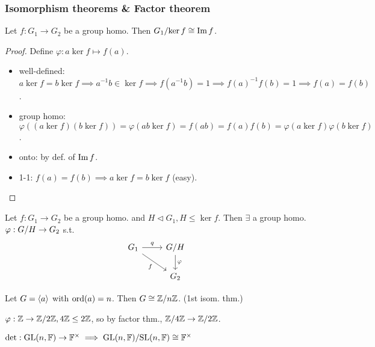 \subsubsection{Isomorphism theorems \& Factor theorem}
\begin{theorem}
  Let $f: G_1 \to G_2$ be a group homo. Then ${G_1}/{\ker f} \cong \operatorname{Im} f$.
  \begin{proof}
    Define $\varphi: a \ker f \mapsto f(a)$.
    \begin{itemize}
      \item well-defined: $a \ker f = b \ker f \implies a^{-1}b \in \ker f
        \implies f(a^{-1}b) = 1 \implies f(a)^{-1}f(b) = 1 \implies f(a)=f(b)$.
      \item group homo: $\varphi\left((a \ker f)(b\ker f)\right) = 
        \varphi(ab \ker f) = f(ab) = f(a)f(b) =
        \varphi(a\ker f)\varphi(b\ker f)$.
      \item onto: by def. of $\operatorname{Im} f$.
      \item 1-1: $f(a) = f(b) \implies a \ker f = b \ker f$ (easy).
      \end{itemize}
  \end{proof}
\end{theorem}

\begin{theorem}
  Let $f: G_1 \to G_2$ be a group homo. and $H \lhd G_1, H \le \ker f$. Then
  $\exists$ a group homo. $\varphi: {G}/{H} \to G_2$ s.t.
  \[
    \begin{tikzcd}
      G_1 \arrow{r}{q} \arrow[swap]{dr}{f} & \quot{G}{H} \arrow{d}{\varphi} \\
      & G_2
    \end{tikzcd}
  \]
\end{theorem}

\begin{example}
  Let $G = \langle a\rangle$ with $\operatorname{ord}(a) = n$. Then $G \cong {\mathbb{Z}}/{n\mathbb{Z}}$.
  (1st isom. thm.)
\end{example}

\begin{example}
  $\varphi: \mathbb{Z} \to {\mathbb{Z}}/{2\mathbb{Z}}, 4\mathbb{Z} \le 2\mathbb{Z}$, so by factor thm.,
  ${\mathbb{Z}}/{4\mathbb{Z}} \to {\mathbb{Z}}/{2\mathbb{Z}}$.
\end{example}

\begin{example}
  $\det: \text{GL}(n, \mathbb{F}) \to \mathbb{F}^\times \implies
  {\text{GL}(n, \mathbb{F})}/{\text{SL}(n, \mathbb{F})} \cong \mathbb{F}^\times$
\end{example}

